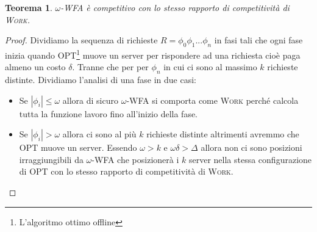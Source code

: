 \documentclass[a4paper, 11pt]{article}
\begin{document}
\newtheorem{competitive}{Teorema}
\begin{competitive}
$\omega$-WFA è competitivo con lo stesso rapporto di competitività di 
\textsc{Work}.
\end{competitive}
\begin{proof}
Dividiamo la sequenza di richieste $R = \phi_0 \phi_1 ... \phi_n$ in fasi tali
che ogni fase inizia quando OPT\footnote{L'algoritmo ottimo offline} muove un 
server per rispondere ad una richiesta cioè paga almeno un costo $\delta$. 
Tranne che per per $\phi_n$ in cui ci sono al massimo $k$ richieste distinte.
Dividiamo l'analisi di una fase in due casi:
\begin{itemize}
    \item Se $|\phi_i| \leq \omega$ allora di sicuro $\omega$-WFA si comporta 
    come \textsc{Work} perché calcola tutta la funzione lavoro fino all'inizio 
    della fase. 
    \item Se $|\phi_i| > \omega$ allora ci sono al più $k$ richieste distinte 
    altrimenti avremmo che OPT muove un server. Essendo $\omega > k$ e 
    $\omega \delta > \Delta$ allora non ci sono posizioni irraggiungibili da 
    $\omega$-WFA che posizionerà i $k$ server nella stessa configurazione di
    OPT con lo stesso rapporto di competitività di \textsc{Work}.
\end{itemize}
\end{proof}
\end{document}
